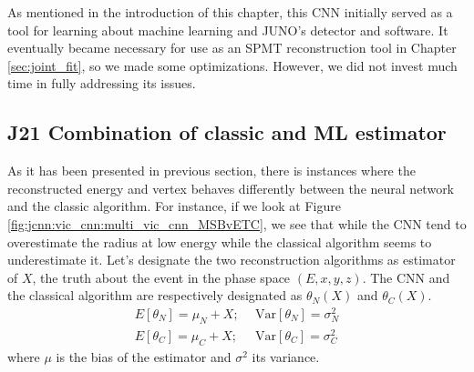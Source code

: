 \documentclass[../main.tex]{subfiles}
\begin{document}
As mentioned in the introduction of this chapter, this CNN initially served as a tool for learning about machine learning and JUNO's detector and software. It eventually became necessary for use as an SPMT reconstruction tool in Chapter \ref{sec:joint_fit}, so we made some optimizations. However, we did not invest much time in fully addressing its issues.

\subsection{J21 Combination of classic and ML estimator}
\label{sec:jcnn:combination}


As it has been presented in previous section, there is instances where the reconstructed energy and vertex behaves differently between the neural network and  the classic algorithm. For instance, if we look at Figure \ref{fig:jcnn:vic_cnn:multi_vic_cnn_MSBvETC}, we see that while the CNN tend to overestimate the radius at low energy while the classical algorithm seems to underestimate it. Let's designate the two reconstruction algorithms as estimator of $X$, the truth about the event in the phase space $(E, x, y, z)$. The CNN and the classical algorithm are respectively designated as $\theta_{N}(X)$ and $\theta_{C}(X)$.
\begin{align}
  E[\theta_{N}] = \mu_N + X; ~&~ \mathrm{Var}[\theta_{N}] = \sigma^2_{N} \\
  E[\theta_{C}] = \mu_C + X; ~&~ \mathrm{Var}[\theta_{C}] = \sigma^2_{C}
\end{align}
where $\mu$ is the bias of the estimator and $\sigma^2$ its variance.
\end{document}
